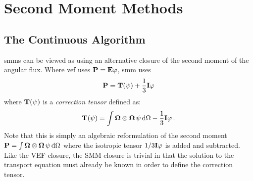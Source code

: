\documentclass[../doc.tex]{subfiles}
\begin{document}
\chapter{Second Moment Methods}

\section{The Continuous Algorithm}
\glspl{smm} can be viewed as using an alternative closure of the second moment of the angular flux. Where \gls{vef} uses $\boldsymbol{\mathrm{P}} = \boldsymbol{\mathrm{E}} \varphi$, \gls{smm} uses 
	\begin{equation}
		\boldsymbol{\mathrm{P}} = \boldsymbol{\mathrm{T}}(\psi) + \frac{1}{3}\boldsymbol{\mathrm{I}} \varphi 
	\end{equation}
where $\boldsymbol{\mathrm{T}}(\psi)$ is a \emph{correction tensor} defined as: 
	\begin{equation}
		\boldsymbol{\mathrm{T}}(\psi) = \int \boldsymbol{\Omega}\otimes\boldsymbol{\Omega}\, \psi \mathop{}\!\mathrm{d} \Omega - \frac{1}{3}\boldsymbol{\mathrm{I}} \varphi \,. 
	\end{equation}
Note that this is simply an algebraic reformulation of the second moment $\boldsymbol{\mathrm{P}} = \int \boldsymbol{\Omega}\otimes\boldsymbol{\Omega}\, \psi \mathop{}\!\mathrm{d} \Omega$ where the isotropic tensor $1/3\boldsymbol{\mathrm{I}}\varphi$ is added and subtracted. 
Like the VEF closure, the SMM closure is trivial in that the solution to the transport equation must already be known in order to define the correction tensor. 
\end{document}
